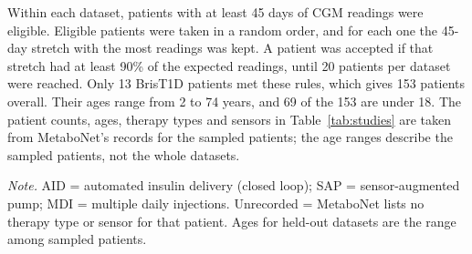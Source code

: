 Within each dataset, patients with at least 45 days of CGM readings were eligible. Eligible patients were taken in a random order, and for each one the 45-day stretch with the most readings was kept. A patient was accepted if that stretch had at least 90\% of the expected readings, until 20 patients per dataset were reached. Only 13 BrisT1D patients met these rules, which gives 153 patients overall. Their ages range from 2 to 74 years, and 69 of the 153 are under 18. The patient counts, ages, therapy types and sensors in Table~\ref{tab:studies} are taken from MetaboNet's records for the sampled patients; the age ranges describe the sampled patients, not the whole datasets.

\begin{table}[htbp]
\caption{Datasets Used in This Paper}
\label{tab:studies}
\small
{}

\vspace{2pt}
\noindent\textit{Note.} AID = automated insulin delivery (closed loop); SAP = sensor-augmented pump; MDI = multiple daily injections. Unrecorded = MetaboNet lists no therapy type or sensor for that patient. Ages for held-out datasets are the range among sampled patients.
\end{table}

